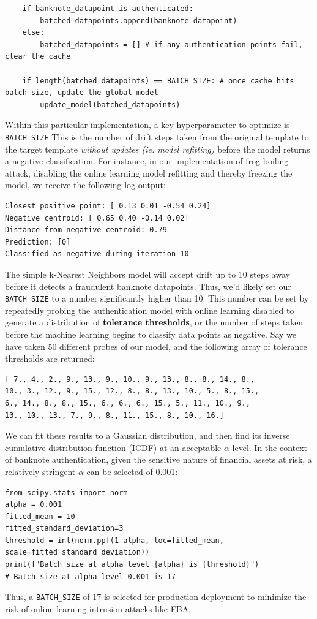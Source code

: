 \documentclass{article}
\begin{document}
\begin{itemize}
\begin{lstlisting}
	if banknote_datapoint is authenticated:
		batched_datapoints.append(banknote_datapoint)
	else:
		batched_datapoints = [] # if any authentication points fail, clear the cache
		
	if length(batched_datapoints) == BATCH_SIZE: # once cache hits batch size, update the global model
		update_model(batched_datapoints)
\end{lstlisting}
Within this particular implementation, a key hyperparameter to optimize is \lstinline!BATCH_SIZE! This is the number of drift steps taken from the original template to the target template \textit{without updates (ie. model refitting)} before the model returns a negative classification. For instance, in our implementation of frog boiling attack, disabling the online learning model refitting and thereby freezing the model, we receive the following log output:
\begin{verbatim}
Closest positive point: [ 0.13 0.01 -0.54 0.24]
Negative centroid: [ 0.65 0.40 -0.14 0.02]
Distance from negative centroid: 0.79
Prediction: [0]
Classified as negative during iteration 10
\end{verbatim}
The simple k-Nearest Neighbors model will accept drift up to 10 steps away before it detects a fraudulent banknote datapoints. Thus, we'd likely set our \lstinline!BATCH_SIZE! to a number significantly higher than 10. This number can be set by repeatedly probing the authentication model with online learning disabled to generate a distribution of \textbf{tolerance thresholds}, or the number of steps taken before the machine learning begins to classify data points as negative. Say we have taken 50 different probes of our model, and the following array of tolerance thresholds are returned:

\begin{verbatim}
[ 7., 4., 2., 9., 13., 9., 10., 9., 13., 8., 8., 14., 8.,
10., 3., 12., 9., 15., 12., 8., 8., 13., 10., 5., 8., 15.,
6., 14., 8., 8., 15., 6., 6., 6., 15., 5., 11., 10., 9.,
13., 10., 13., 7., 9., 8., 11., 15., 8., 10., 16.]
\end{verbatim}

We can fit these results to a Gaussian distribution, and then find its inverse cumulative distribution function (ICDF) at an acceptable $\alpha$ level. In the context of banknote authentication, given the sensitive nature of financial assets at risk, a relatively stringent $\alpha$ can be selected of 0.001:
\begin{lstlisting}
from scipy.stats import norm
alpha = 0.001
fitted_mean = 10
fitted_standard_deviation=3
threshold = int(norm.ppf(1-alpha, loc=fitted_mean, scale=fitted_standard_deviation))
print(f"Batch size at alpha level {alpha} is {threshold}")
# Batch size at alpha level 0.001 is 17
\end{lstlisting}

Thus, a \lstinline!BATCH_SIZE! of 17 is selected for production deployment to minimize the risk of online learning intrusion attacks like FBA.

 \end{itemize}
\end{document}

